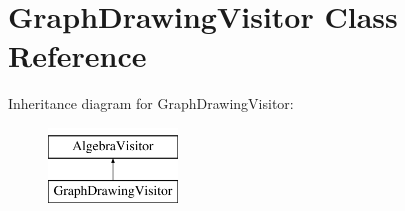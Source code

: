 \hypertarget{class_graph_drawing_visitor}{\section{Graph\+Drawing\+Visitor Class Reference}
\label{class_graph_drawing_visitor}
}
Inheritance diagram for Graph\+Drawing\+Visitor\+:\begin{figure}[H]
\begin{center}
\leavevmode
\includegraphics[height=2.000000cm]{class_graph_drawing_visitor}
\end{center}
\end{figure}
